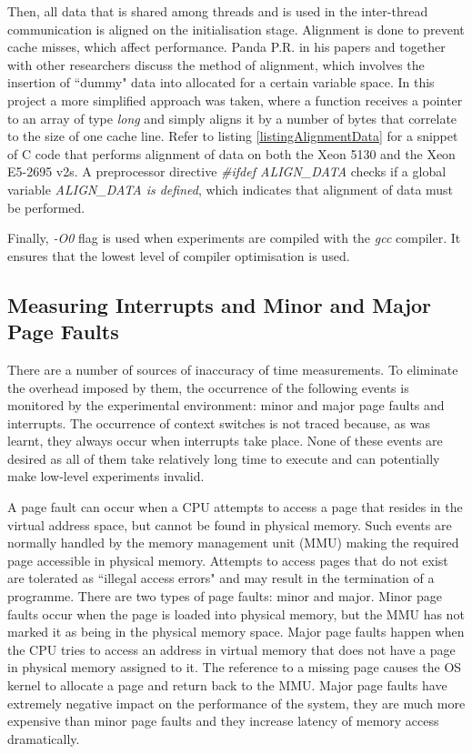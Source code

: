 Then, all data that is shared among threads and is used in the inter-thread communication is aligned on the initialisation stage. Alignment is done to prevent cache misses, which affect performance. Panda P.R. in his papers \cite{Panda1999} and \cite{RanjanPanda1997} together with other researchers discuss the method of alignment, which involves the insertion of ``dummy" data into allocated for a certain variable space. In this project a more simplified approach was taken, where a function receives a pointer to an array of type \textit{long} and simply aligns it by a number of bytes that correlate to the size of one cache line. Refer to listing \ref{listingAlignmentData} for a snippet of C code that performs alignment of data on both the Xeon 5130 and the Xeon E5-2695 v2s. A preprocessor directive \textit{\#ifdef ALIGN\_DATA} checks if a global variable \textit{ALIGN\_DATA is defined}, which indicates that alignment of data must be performed.

Finally, \textit{-O0} flag is used when experiments are compiled with the \textit{gcc} compiler. It ensures that the lowest level of compiler optimisation is used.

\subsection{Measuring Interrupts and Minor and Major Page Faults}

There are a number of sources of inaccuracy of time measurements. To eliminate the overhead imposed by them, the occurrence of the following events is monitored by the experimental environment: minor and major page faults and interrupts. The occurrence of context switches is not traced because, as was learnt, they always occur when interrupts take place. None of these events are desired as all of them take relatively long time to execute and can potentially make low-level experiments invalid.

A page fault can occur when a CPU attempts to access a page that resides in the virtual address space, but cannot be found in physical memory. Such events are normally handled by the memory management unit (MMU) making the required page accessible in physical memory. Attempts to access pages that do not exist are tolerated as ``illegal access errors" and may result in the termination of a programme. There are two types of page faults: minor and major. Minor page faults occur when the page is loaded into physical memory, but the MMU has not marked it as being in the physical memory space. Major page faults happen when the CPU tries to access an address in virtual memory that does not have a page in physical memory assigned to it. The reference to a missing page causes the OS kernel to allocate a page and return back to the MMU. Major page faults have extremely negative impact on the performance of the system, they are much more expensive than minor page faults and they increase latency of memory access dramatically. \cite{rao2008computer}

